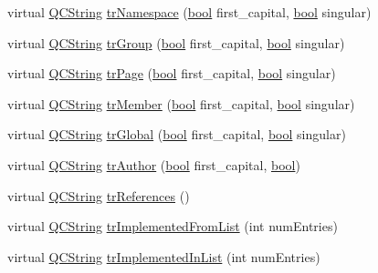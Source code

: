 \begin{DoxyCompactItemize}
\item 
virtual \hyperlink{class_q_c_string}{Q\+C\+String} \hyperlink{class_translator_swedish_aa9a556538d0a25b97bdae7576b4b46c1}{tr\+Namespace} (\hyperlink{qglobal_8h_a1062901a7428fdd9c7f180f5e01ea056}{bool} first\+\_\+capital, \hyperlink{qglobal_8h_a1062901a7428fdd9c7f180f5e01ea056}{bool} singular)
\item 
virtual \hyperlink{class_q_c_string}{Q\+C\+String} \hyperlink{class_translator_swedish_a19b0e56378fccc350129ad5fbb64fc4a}{tr\+Group} (\hyperlink{qglobal_8h_a1062901a7428fdd9c7f180f5e01ea056}{bool} first\+\_\+capital, \hyperlink{qglobal_8h_a1062901a7428fdd9c7f180f5e01ea056}{bool} singular)
\item 
virtual \hyperlink{class_q_c_string}{Q\+C\+String} \hyperlink{class_translator_swedish_ab22c79420022d4e97411fed16c34fe01}{tr\+Page} (\hyperlink{qglobal_8h_a1062901a7428fdd9c7f180f5e01ea056}{bool} first\+\_\+capital, \hyperlink{qglobal_8h_a1062901a7428fdd9c7f180f5e01ea056}{bool} singular)
\item 
virtual \hyperlink{class_q_c_string}{Q\+C\+String} \hyperlink{class_translator_swedish_a0eeef1b59e1f6ccd48d7638f0064fb10}{tr\+Member} (\hyperlink{qglobal_8h_a1062901a7428fdd9c7f180f5e01ea056}{bool} first\+\_\+capital, \hyperlink{qglobal_8h_a1062901a7428fdd9c7f180f5e01ea056}{bool} singular)
\item 
virtual \hyperlink{class_q_c_string}{Q\+C\+String} \hyperlink{class_translator_swedish_aed9e16cc2dbe30bb5ab30cf7ddc7f4cb}{tr\+Global} (\hyperlink{qglobal_8h_a1062901a7428fdd9c7f180f5e01ea056}{bool} first\+\_\+capital, \hyperlink{qglobal_8h_a1062901a7428fdd9c7f180f5e01ea056}{bool} singular)
\item 
virtual \hyperlink{class_q_c_string}{Q\+C\+String} \hyperlink{class_translator_swedish_a717ca5ea8f7e681c1db5a1b7e8bdf4c0}{tr\+Author} (\hyperlink{qglobal_8h_a1062901a7428fdd9c7f180f5e01ea056}{bool} first\+\_\+capital, \hyperlink{qglobal_8h_a1062901a7428fdd9c7f180f5e01ea056}{bool})
\item 
virtual \hyperlink{class_q_c_string}{Q\+C\+String} \hyperlink{class_translator_swedish_ae65478edcd784c004882fa26d6d6044d}{tr\+References} ()
\item 
virtual \hyperlink{class_q_c_string}{Q\+C\+String} \hyperlink{class_translator_swedish_a21510bb58e60d35465a39379543e16c1}{tr\+Implemented\+From\+List} (int num\+Entries)
\item 
virtual \hyperlink{class_q_c_string}{Q\+C\+String} \hyperlink{class_translator_swedish_a2ae2842d082351b56fc10d28a83bb6c2}{tr\+Implemented\+In\+List} (int num\+Entries)

\end{DoxyCompactItemize}

